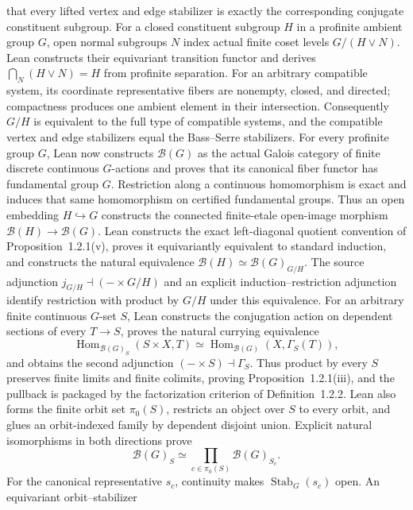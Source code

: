 \begin{definition}
  that every lifted vertex and edge stabilizer is exactly the corresponding
  conjugate constituent subgroup.  For a closed constituent subgroup $H$ in a
  profinite ambient group $G$, open normal subgroups $N$ index actual finite
  coset levels $G/(H\vee N)$.  Lean constructs their equivariant transition
  functor and derives $\bigcap_N(H\vee N)=H$ from profinite separation.  For
  an arbitrary compatible system, its coordinate representative fibers are
  nonempty, closed, and directed; compactness produces one ambient element in
  their intersection.  Consequently $G/H$ is equivalent to the full type of
  compatible systems, and the compatible vertex and edge stabilizers equal
  the Bass--Serre stabilizers.
  For every profinite group $G$, Lean now constructs $\mathcal B(G)$ as the
  actual Galois category of finite discrete continuous $G$-actions and proves
  that its canonical fiber functor has fundamental group $G$.  Restriction
  along a continuous homomorphism is exact and induces that same homomorphism
  on certified fundamental groups.  Thus an open embedding $H\hookrightarrow
  G$ constructs the connected finite-etale open-image morphism
  $\mathcal B(H)\to\mathcal B(G)$.  Lean constructs the exact left-diagonal
  quotient convention of Proposition~1.2.1(v), proves it equivariantly
  equivalent to standard induction, and constructs the natural equivalence
  $\mathcal B(H)\simeq\mathcal B(G)_{G/H}$.  The source adjunction
  $j_{G/H}\dashv(-\times G/H)$ and an explicit induction--restriction
  adjunction identify restriction with product by $G/H$ under this
  equivalence.  For an arbitrary finite continuous $G$-set $S$, Lean
  constructs the conjugation action on dependent sections of every
  $T\to S$, proves the natural currying equivalence
  \[
    \operatorname{Hom}_{\mathcal B(G)_S}(S\times X,T)
      \simeq
    \operatorname{Hom}_{\mathcal B(G)}(X,\Gamma_S(T)),
  \]
  and obtains the second adjunction
  $(-\times S)\dashv\Gamma_S$.  Thus product by every $S$ preserves finite
  limits and finite colimits, proving Proposition~1.2.1(iii), and the
  pullback is packaged by the factorization criterion of
  Definition~1.2.2.  Lean also forms the finite orbit set $\pi_0(S)$,
  restricts an object over $S$ to every orbit, and glues an orbit-indexed
  family by dependent disjoint union.  Explicit natural isomorphisms in both
  directions prove
  \[
    \mathcal B(G)_S \simeq
      \prod_{c\in\pi_0(S)}\mathcal B(G)_{S_c}.
  \]
  For the canonical representative $s_c$, continuity makes
  $\operatorname{Stab}_G(s_c)$ open.  An equivariant orbit--stabilizer

\end{definition}

